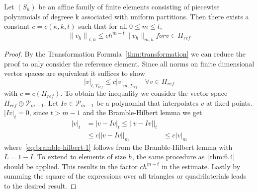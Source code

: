 \begin{thmx}
    Let $(S_h)$ be an affine family of finite elements consisting of piecewise polynmoials of degreee k associated with uniform partitions. Then there exists a constant $c = c(\kappa, k, t)$ such that for all $0 \leq m \leq t$,
    \begin{equation}
        {\|v_h\|}_{t,h} \leq ch^{m-t}\|v_h\|_{m,h} for v \in \Pi_{ref}
    \end{equation}
\end{thmx}

\begin{proof}
    By the Transformation Formula~\ref{thm:transformation} we can reduce the proof to only consider the reference element. Since all norms on finite dimensional vector spaces are equivalent it suffices to show
    \begin{equation}
        |v|_{t,T_{ref}} \leq c |v|_{m, T_{ref}} \quad \forall v \in \Pi_{ref}
    \end{equation}
    with $c = c(\Pi_{ref})$. To obtain the inequality we consider the vector space $\Pi_{ref}\oplus \mathcal{P}_{m-1}$. Let $Iv \in \mathcal{P}_{m-1}$ be a polynomial that interpolates $v$ at fixed points. $|Iv|_t = 0$, since $t > m-1$ and the Bramble-Hilbert lemma we get
    \begin{align}
        |v|_t &= |v-Iv|_t \leq ||v-Iv||_t \\
              &\leq c||v-Iv||_m 
              &\leq c|v|_m\label{eq:bramble-hilbert-1}
    \end{align}
    where~\eqref{eq:bramble-hilbert-1} follows from the Bramble-Hilbert lemma with $L=1-I$. To extend to elements of size $h$, the same procedure as~\ref{thm:6.4} should be applied. This results in the factor $ch^{m-t}$ in the estimate. Lastly by summing the square of the expressions over all triangles or quadrilaterials leads to the desired result.
\end{proof}
